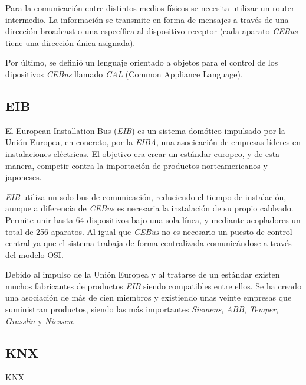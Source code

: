 Para la comunicación entre distintos medios físicos se necesita utilizar un router intermedio. La información se transmite en forma de mensajes a través de una dirección broadcast o una específica al dispositivo receptor (cada aparato \emph{CEBus} tiene una dirección única asignada).

Por último, se definió un lenguaje orientado a objetos para el control de los dipositivos \emph{CEBus} llamado \emph{CAL} (Common Appliance Language).

\subsection{EIB}

El European Installation Bus (\emph{EIB}) es un sistema domótico impulsado por la Unión Europea, en concreto, por la \emph{EIBA}, una asocicación de empresas líderes en instalaciones eléctricas. El objetivo era crear un estándar europeo, y de esta manera, competir contra la importación de productos norteamericanos y japoneses.

\emph{EIB} utiliza un solo bus de comunicación, reduciendo el tiempo de instalación, aunque a diferencia de \emph{CEBus} es necesaria la instalación de su propio cableado. Permite unir hasta 64 dispositivos bajo una sola línea, y mediante acopladores un total de 256 aparatos. Al igual que \emph{CEBus} no es necesario un puesto de control central ya que el sistema trabaja de forma centralizada comunicándose a través del modelo OSI.

Debido al impulso de la Unión Europea y al tratarse de un estándar existen muchos fabricantes de productos \emph{EIB} siendo compatibles entre ellos. Se ha creado una asociación de más de cien miembros y existiendo unas veinte empresas que suministran productos, siendo las más importantes \emph{Siemens}, \emph{ABB}, \emph{Temper}, \emph{Grasslin} y \emph{Niessen}.

\subsection{KNX}

KNX